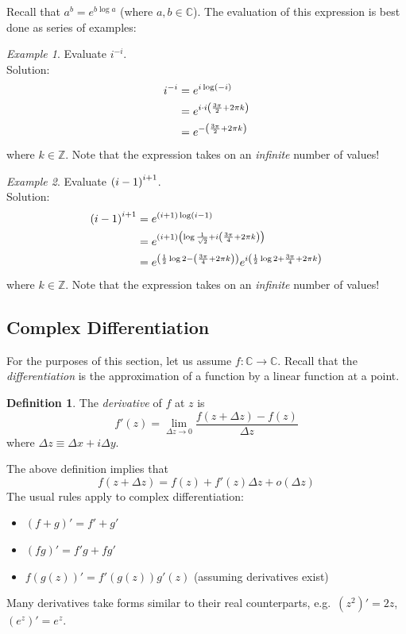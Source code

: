 \documentclass[10pt]{scrartcl}
\numberwithin{equation}{subsection}
\theoremstyle{definition}
\newtheorem{definition}{Definition}[section]
\theoremstyle{remark}
\newtheorem*{example}{Example}
\newenvironment{definitionSR}
	{
		\begin{siderules}
			\begin{definition}
			}
			{
			\end{definition}
		\end{siderules}
	}
\newcommand{\Complex}{\mathbb{C}}
\newcommand{\Integers}{\mathbb{Z}}
\begin{document}
Recall that $a^b = e^{b \log a}$ (where $a,b\in\Complex$). The evaluation of 
this expression is best done as series of examples:
\begin{example}
	Evaluate $i^{-i}$.\\
	Solution:
	\begin{align*}
		i^{-i} &= e^{i\log(-i)}\\
				&= e^{i \cdot i\qty(\frac{3\pi}{2} + 2\pi k)}\\
				&= e^{-\pqty{\frac{3\pi}{2} + 2\pi k}}
	\end{align*}
	where $k\in\Integers$. Note that the expression takes on an
	\emph{infinite} number of values!
\end{example}
\begin{example}
	Evaluate $ \pqty{i-1}^{i+1}$.\\
	Solution:
	\begin{align*}
		\pqty{i-1}^{i+1} &= e^{(i+1)\log(i-1)}\\
		  &= e^{(i+1)\qty(\log{\frac{1}{\sqrt{2}}} + i\qty(\frac{3\pi}{4} + 2\pi k))}\\
		  &= e^{\pqty{\frac{1}{2}\log{2} -\qty(\frac{3\pi}{4} + 2\pi k)}}
		e^{i\pqty{\frac{1}{2}\log{2} + \frac{3\pi}{4} + 2\pi k}}
	\end{align*}
	where $k \in \Integers$. Note that the expression takes on an
	\emph{infinite} number of values!
\end{example}
\subsection{Complex Differentiation}
For the purposes of this section, let us assume $f : \Complex \to \Complex$.
Recall that the \textit{differentiation} is the approximation of a function by a
linear function at a point.
\begin{definitionSR}
	The \textit{derivative} of $f$ at $z$ is
	\begin{equation*}
		f'(z) = \lim_{\Delta z \to 0} \frac{f(z + \Delta z) -
		f(z)}{\Delta z}
	\end{equation*}
	where $\Delta z \equiv \Delta x + i \Delta y$.
\end{definitionSR}
The above definition implies that
\begin{equation}
	f(z + \Delta z) = f(z) + f'(z) \Delta z + o(\Delta z)
\end{equation}
The usual rules apply to complex differentiation:
\begin{itemize}
	\item $(f + g)' = f' + g'$
	\item $(fg)' = f'g + fg'$ 
	\item $f(g(z))' = f'(g(z))g'(z)$ (assuming derivatives exist)
\end{itemize}
Many derivatives take forms similar to their real counterparts, e.g.\ $(z^2)' =
2z$, $(e^z)' = e^z$. 
\end{document}
